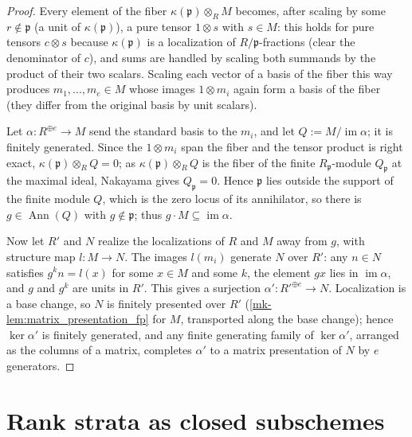 \begin{proof}
  \leanok
  Every element of the fiber \(\kappa(\mathfrak p) \otimes_R M\) becomes,
  after scaling by some \(r \notin \mathfrak p\) (a unit of
  \(\kappa(\mathfrak p)\)), a pure tensor \(1 \otimes s\) with \(s \in M\):
  this holds for pure tensors \(c \otimes s\) because
  \(\kappa(\mathfrak p)\) is a localization of \(R/\mathfrak p\)-fractions
  (clear the denominator of \(c\)), and sums are handled by scaling both
  summands by the product of their two scalars.  Scaling each vector of a
  basis of the fiber this way produces \(m_1, \dots, m_e \in M\) whose
  images \(1 \otimes m_i\) again form a basis of the fiber (they differ from
  the original basis by unit scalars).

  Let \(\alpha : R^{\oplus e} \to M\) send the standard basis to the
  \(m_i\), and let \(Q := M / \operatorname{im} \alpha\); it is finitely
  generated.  Since the \(1 \otimes m_i\) span the fiber and the tensor
  product is right exact, \(\kappa(\mathfrak p) \otimes_R Q = 0\); as
  \(\kappa(\mathfrak p) \otimes_R Q\) is the fiber of the finite
  \(R_{\mathfrak p}\)-module \(Q_{\mathfrak p}\) at the maximal ideal,
  Nakayama gives \(Q_{\mathfrak p} = 0\).  Hence \(\mathfrak p\) lies
  outside the support of the finite module \(Q\), which is the zero locus
  of its annihilator, so there is \(g \in \operatorname{Ann}(Q)\) with
  \(g \notin \mathfrak p\); thus \(g \cdot M \subseteq
  \operatorname{im} \alpha\).

  Now let \(R'\) and \(N\) realize the localizations of \(R\) and \(M\)
  away from \(g\), with structure map \(l : M \to N\).  The images
  \(l(m_i)\) generate \(N\) over \(R'\): any \(n \in N\) satisfies
  \(g^k n = l(x)\) for some \(x \in M\) and some \(k\), the element
  \(g x\) lies in \(\operatorname{im} \alpha\), and \(g\) and \(g^k\) are
  units in \(R'\).  This gives a surjection
  \(\alpha' : R'^{\oplus e} \to N\).  Localization is a base change, so
  \(N\) is finitely presented over \(R'\)
  (\ref{mk-lem:matrix_presentation_fp} for \(M\), transported along the base
  change); hence \(\ker \alpha'\) is finitely generated, and any finite
  generating family of \(\ker \alpha'\), arranged as the columns of a
  matrix, completes \(\alpha'\) to a matrix presentation of \(N\) by \(e\)
  generators.
\end{proof}

\section{Rank strata as closed subschemes}
\label{mk-sec:flatstrat_rank_stratum}

